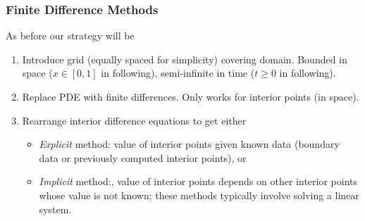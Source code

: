 \documentclass{beamer}
\begin{document}
\begin{frame}
  \frametitle{Finite Difference Methods}

  As before our strategy will be
  \begin{enumerate}
  \item<1-> Introduce grid (equally spaced for simplicity) covering
    domain. \pause Bounded in space ($x \in [0,1]$ in following),
    semi-infinite in time ($t \ge 0$ in following).
  \item<3-> Replace PDE with finite differences. Only works for
    interior points (in space).
  \item<4-> Rearrange interior difference equations to get either
    \begin{itemize}
    \item \emph{Explicit} method: value of interior
      points given known data (boundary data or previously
      computed interior points), or
    \item<5-> \emph{Implicit} method:, value of interior points
      depends on other interior points whose value is not known; these
      methods typically involve solving a linear system.
    \end{itemize}
  \end{enumerate}

\end{frame}
\end{document}

